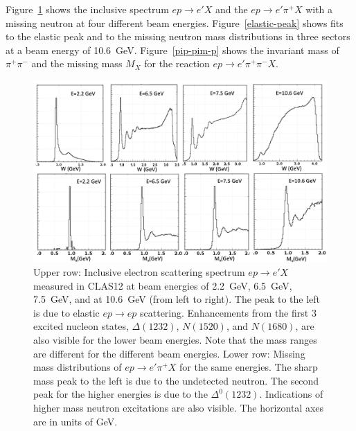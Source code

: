 \documentclass[final,3p,twocolumn]{elsarticle}
\begin{document}
Figure~\ref{spectrum} shows the inclusive spectrum $ep \to e' X$ and the $ep \to e' \pi^+ X$ with a missing
neutron at four different beam energies. Figure~\ref{elastic-peak} shows fits to the elastic peak and to the
missing neutron mass distributions in three sectors at a beam energy of 10.6~GeV. Figure~\ref{pip-pim-p} shows
the invariant mass of $\pi^+\pi^-$ and the missing mass $M_X$ for the reaction $ep \to e' \pi^+ \pi^- X$.  

\begin{figure}[ht]
\centerline{\includegraphics[width=1.5\columnwidth]{W-spectrum.png}}
\caption{Upper row: Inclusive electron scattering spectrum $ep \to e' X$ measured in CLAS12 at beam energies 
of 2.2~GeV, 6.5~GeV, 7.5~GeV, and at 10.6~GeV (from left to right). The peak to the left is due to elastic $ep \to ep$
scattering. Enhancements from the first 3 excited nucleon states, $\Delta(1232)$, $N(1520)$, and $N(1680)$, are also
visible for the lower beam energies. Note that the mass ranges  are different for the different beam energies. Lower
row:  Missing mass distributions of $ep\to e' \pi^+X$ for the same energies. The sharp mass peak to the left is due
to the undetected neutron. The second peak for the higher energies is due to the $\Delta^0(1232)$. Indications of higher
mass neutron excitations are also visible. The horizontal axes are in units of GeV. } 
\label{spectrum}
\end{figure} 
\end{document}
